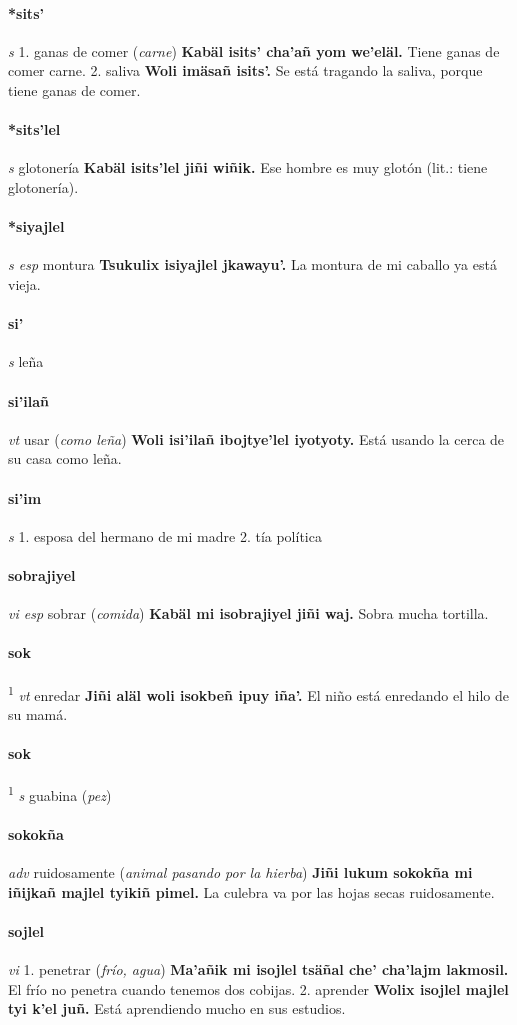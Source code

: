 \documentclass{scrbook}
\newcommand{\entry}[1]{\paragraph{#1}}
\newcommand{\onedefinition}[1]{#1.}
\newcommand{\defsuperscript}[1]{\textsuperscript{1}}
\newcommand{\partofspeech}[1]{\textit{#1}}
\newcommand{\spanishtranslation}[1]{#1}
\newcommand{\clarification}[1]{(\textit{#1})}
\newcommand{\cholexample}[1]{\textbf{#1}}
\newcommand{\exampletranslation}[1]{#1}
\begin{document}
\begin{multicols}{2}
\entry{*sits'}
\partofspeech{s}
\onedefinition{1}
\spanishtranslation{ganas de comer}
\clarification{carne}
\cholexample{Kabäl isits' cha'añ yom we'eläl.}
\exampletranslation{Tiene ganas de comer carne.}
\onedefinition{2}
\spanishtranslation{saliva}
\cholexample{Woli imäsañ isits'.}
\exampletranslation{Se está tragando la saliva, porque tiene ganas de comer.}

\entry{*sits'lel}
\partofspeech{s}
\spanishtranslation{glotonería}
\cholexample{Kabäl isits'lel jiñi wiñik.}
\exampletranslation{Ese hombre es muy glotón (lit.: tiene glotonería).}

\entry{*siyajlel}
\partofspeech{s esp}
\spanishtranslation{montura}
\cholexample{Tsukulix isiyajlel jkawayu'.}
\exampletranslation{La montura de mi caballo ya está vieja.}

\entry{si'}
\partofspeech{s}
\spanishtranslation{leña}

\entry{si'ilañ}
\partofspeech{vt}
\spanishtranslation{usar}
\clarification{como leña}
\cholexample{Woli isi'ilañ ibojtye'lel iyotyoty.}
\exampletranslation{Está usando la cerca de su casa como leña.}

\entry{si'im}
\partofspeech{s}
\onedefinition{1}
\spanishtranslation{esposa del hermano de mi madre}
\onedefinition{2}
\spanishtranslation{tía política}

\entry{sobrajiyel}
\partofspeech{vi esp}
\spanishtranslation{sobrar}
\clarification{comida}
\cholexample{Kabäl mi isobrajiyel jiñi waj.}
\exampletranslation{Sobra mucha tortilla.}

\entry{sok}
\defsuperscript{1}
\partofspeech{vt}
\spanishtranslation{enredar}
\cholexample{Jiñi aläl woli isokbeñ ipuy iña'.}
\exampletranslation{El niño está enredando el hilo de su mamá.}

\entry{sok}
\defsuperscript{2}
\partofspeech{s}
\spanishtranslation{guabina}
\clarification{pez}

\entry{sokokña}
\partofspeech{adv}
\spanishtranslation{ruidosamente}
\clarification{animal pasando por la hierba}
\cholexample{Jiñi lukum sokokña mi iñijkañ majlel tyikiñ pimel.}
\exampletranslation{La culebra va por las hojas secas ruidosamente.}

\entry{sojlel}
\partofspeech{vi}
\onedefinition{1}
\spanishtranslation{penetrar}
\clarification{frío, agua}
\cholexample{Ma'añik mi isojlel tsäñal che' cha'lajm lakmosil.}
\exampletranslation{El frío no penetra cuando tenemos dos cobijas.}
\onedefinition{2}
\spanishtranslation{aprender}
\cholexample{Wolix isojlel majlel tyi k'el juñ.}
\exampletranslation{Está aprendiendo mucho en sus estudios.}


\end{multicols}
\end{document}
